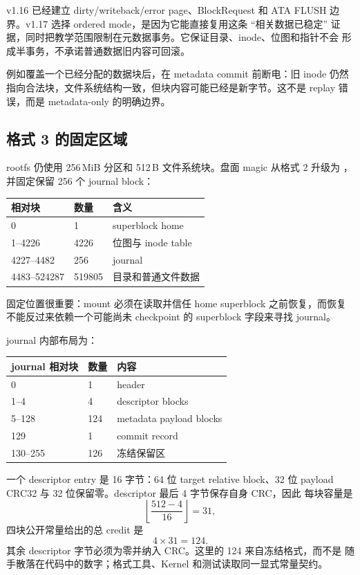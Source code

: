 v1.16 已经建立 dirty/writeback/error page、BlockRequest 和 ATA FLUSH
边界。v1.17 选择 ordered mode，是因为它能直接复用这条 ``相关数据已稳定''
证据，同时把教学范围限制在元数据事务。它保证目录、inode、位图和指针不会
形成半事务，不承诺普通数据旧内容可回滚。

例如覆盖一个已经分配的数据块后，在 metadata commit 前断电：旧 inode 仍然
指向合法块，文件系统结构一致，但块内容可能已经是新字节。这不是 replay
错误，而是 metadata-only 的明确边界。

\subsection{格式 3 的固定区域}

rootfs 仍使用 256\,MiB 分区和 512\,B 文件系统块。盘面 magic 从格式 2
升级为 ，并固定保留 256 个 journal block：

\begin{center}
\begin{tabular}{lll}
\toprule
相对块 & 数量 & 含义\\
\midrule
0 & 1 & superblock home\\
1--4226 & 4226 & 位图与 inode table\\
4227--4482 & 256 & journal\\
4483--524287 & 519805 & 目录和普通文件数据\\
\bottomrule
\end{tabular}
\end{center}

固定位置很重要：mount 必须在读取并信任 home superblock 之前恢复，而恢复
不能反过来依赖一个可能尚未 checkpoint 的 superblock 字段来寻找 journal。

journal 内部布局为：

\begin{center}
\begin{tabular}{lll}
\toprule
journal 相对块 & 数量 & 内容\\
\midrule
0 & 1 & header\\
1--4 & 4 & descriptor blocks\\
5--128 & 124 & metadata payload blocks\\
129 & 1 & commit record\\
130--255 & 126 & 冻结保留区\\
\bottomrule
\end{tabular}
\end{center}

一个 descriptor entry 是 16 字节：64 位 target relative block、32 位
payload CRC32 与 32 位保留零。descriptor 最后 4 字节保存自身 CRC，因此
每块容量是
\[
  \left\lfloor\frac{512-4}{16}\right\rfloor=31,
\]
四块公开常量给出的总 credit 是
\[
  4\times31=124.
\]
其余 descriptor 字节必须为零并纳入 CRC。这里的 124 来自冻结格式，而不是
随手散落在代码中的数字；格式工具、Kernel 和测试读取同一显式常量契约。

